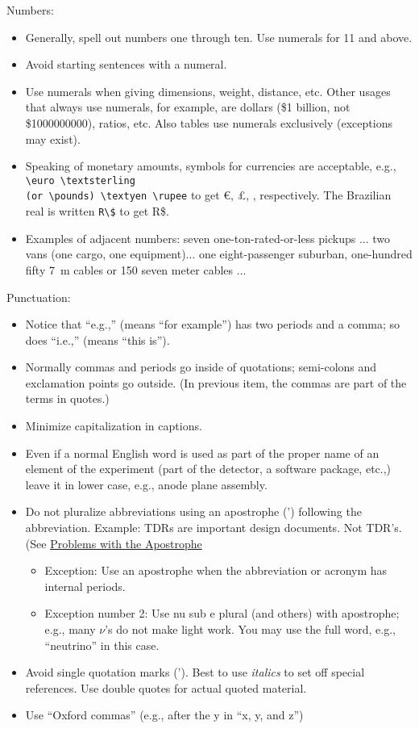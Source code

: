 Numbers:
\begin{itemize}
\item Generally, spell out numbers one through ten. Use numerals for \num{11} and above.
\item Avoid starting sentences with a numeral.
\item Use numerals when giving dimensions, weight, distance, etc. Other usages that always use numerals, for example, are dollars (\$1 billion, not \$\num{1000000000}), ratios, etc. Also tables use numerals exclusively (exceptions may exist).
\item Speaking of monetary amounts, symbols for currencies are acceptable, e.g., \verb|\euro \textsterling| \\
 \verb|(or \pounds) \textyen \rupee| to get \euro, \pounds, \textyen, \rupee{} respectively. The Brazilian real is written \verb|R\$| to get R\$.

\item Examples of adjacent numbers: seven one-ton-rated-or-less pickups ... two vans (one cargo, one equipment)... one eight-passenger suburban, one-hundred fifty \SI{7}{\meter} cables or 150 seven meter cables ...
\end{itemize}

Punctuation:
\begin{itemize}
\item Notice that ``e.g.,'' (means ``for example'') has two periods and a comma; so does ``i.e.,'' (means ``this is'').
\item Normally commas and periods go inside of quotations;  semi-colons and exclamation points go outside.  (In previous item, the commas are part of the terms in quotes.)
\item Minimize capitalization in captions.
\item Even if a normal English word is used as part of the proper name of an element of the experiment (part of the detector, a software package, etc.,) leave it in lower case, e.g., anode plane assembly. 
\item Do not pluralize abbreviations using an apostrophe (') following the abbreviation. Example: TDRs are important design documents. Not TDR's. (See \href{http://redpenretired.blogspot.com/2014/10/problems-with-apostrophe.html}{Problems with the Apostrophe}
\begin{itemize}
\item Exception: Use an apostrophe when the abbreviation or acronym has internal periods. 
\item Exception number \num{2}: Use nu sub e plural (and others) with apostrophe; e.g., many $\nu$'s do not make light work. You may use the full word, e.g., ``neutrino'' in this case.
\end{itemize}
\item Avoid single quotation marks ('). Best to use \textit{italics} to set off special references. Use double quotes for actual quoted material.  
\item Use ``Oxford commas'' (e.g., after the y in ``x, y, and z'') 
\end{itemize}


